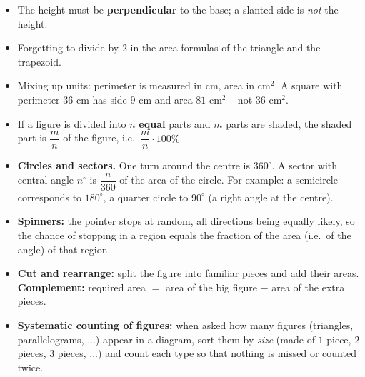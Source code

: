 \begin{warnbox}
\begin{itemize}[leftmargin=1.3em,itemsep=1pt,topsep=0pt]
  \item The height must be \textbf{perpendicular} to the base; a slanted side is \emph{not} the height.
  \item Forgetting to divide by $2$ in the area formulas of the triangle and the trapezoid.
  \item Mixing up units: perimeter is measured in cm, area in $\text{cm}^2$. A square with perimeter $36$ cm has side $9$ cm and area $81\text{ cm}^2$ -- not $36\text{ cm}^2$.
\end{itemize}
\end{warnbox}

\begin{knowbox}
\begin{itemize}[leftmargin=1.3em,itemsep=2pt,topsep=2pt]
  \item If a figure is divided into $n$ \textbf{equal} parts and $m$ parts are shaded, the shaded part is $\dfrac{m}{n}$ of the figure, i.e.\ $\dfrac{m}{n}\cdot 100\%$.
  \item \textbf{Circles and sectors.} One turn around the centre is $360^\circ$. A sector with central angle $n^\circ$ is $\dfrac{n}{360}$ of the area of the circle. For example: a semicircle corresponds to $180^\circ$, a quarter circle to $90^\circ$ (a right angle at the centre).
  \item \textbf{Spinners:} the pointer stops at random, all directions being equally likely, so the chance of stopping in a region equals the fraction of the area (i.e.\ of the angle) of that region.
  \item \textbf{Cut and rearrange:} split the figure into familiar pieces and add their areas. \textbf{Complement:} required area $=$ area of the big figure $-$ area of the extra pieces.
  \item \textbf{Systematic counting of figures:} when asked how many figures (triangles, parallelograms, ...) appear in a diagram, sort them by \emph{size} (made of $1$ piece, $2$ pieces, $3$ pieces, ...) and count each type so that nothing is missed or counted twice.
\end{itemize}
\end{knowbox}

